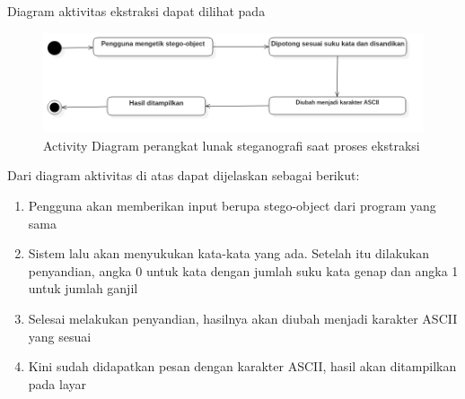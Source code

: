 Diagram aktivitas ekstraksi dapat dilihat pada 

\begin{figure}[H]
	\centering
	\includegraphics[scale=0.5]{Gambar/activity-ekstraksi}
	\caption{Activity Diagram perangkat lunak steganografi saat proses ekstraksi} 
	\label{fig:4_activity-ekstraksi}
\end{figure}

Dari diagram aktivitas di atas dapat dijelaskan sebagai berikut:

\begin{enumerate}
	\item Pengguna akan memberikan input berupa stego-object dari program yang sama
	\item Sistem lalu akan menyukukan kata-kata yang ada. Setelah itu dilakukan penyandian, angka 0 untuk kata dengan jumlah suku kata genap dan angka 1 untuk jumlah ganjil
	\item Selesai melakukan penyandian, hasilnya akan diubah menjadi karakter ASCII yang sesuai
	\item Kini sudah didapatkan pesan dengan karakter ASCII, hasil akan ditampilkan pada layar
\end{enumerate}